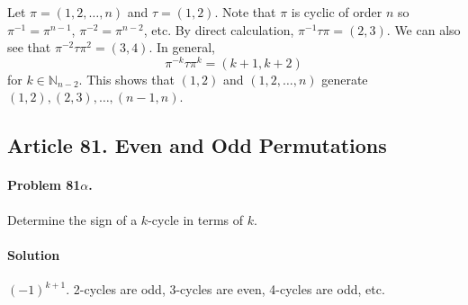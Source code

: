 Let $\pi = (1,2,\dots,n)$ and $\tau =(1,2)$. Note that $\pi$ is cyclic of order
$n$ so $\pi^{-1} = \pi^{n-1}$, $\pi^{-2} = \pi^{n-2}$, etc.
By direct calculation, $\pi^{-1}\tau\pi = (2,3)$. We can also see that
$\pi^{-2}\tau\pi^2 = (3,4)$. In general, $$\pi^{-k}\tau\pi^k = (k+1,k+2)$$ for
$k \in \mathbb{N}_{n-2}$. This shows that $(1,2)$ and $(1,2, \dots, n)$ generate
$(1,2), (2,3), \dots, (n-1,n)$.

\subsection{Article 81. Even and Odd Permutations}

\paragraph{Problem 81$\alpha$.}
Determine the sign of a $k$-cycle in terms of $k$.

\paragraph*{Solution}
$(-1)^{k+1}$. 2-cycles are odd, 3-cycles are even, 4-cycles are odd, etc.

